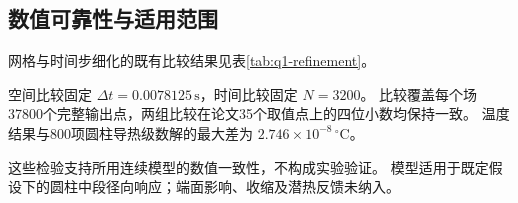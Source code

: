 \subsection{数值可靠性与适用范围}
网格与时间步细化的既有比较结果见表\ref{tab:q1-refinement}。

空间比较固定 $\Delta t=0.0078125\,\mathrm{s}$，时间比较固定 $N=3200$。
比较覆盖每个场37800个完整输出点，两组比较在论文35个取值点上的四位小数均保持一致。
温度结果与800项圆柱导热级数解的最大差为 $2.746\times10^{-8}\,{}^\circ\mathrm C$。

这些检验支持所用连续模型的数值一致性，不构成实验验证。
模型适用于既定假设下的圆柱中段径向响应；端面影响、收缩及潜热反馈未纳入。
